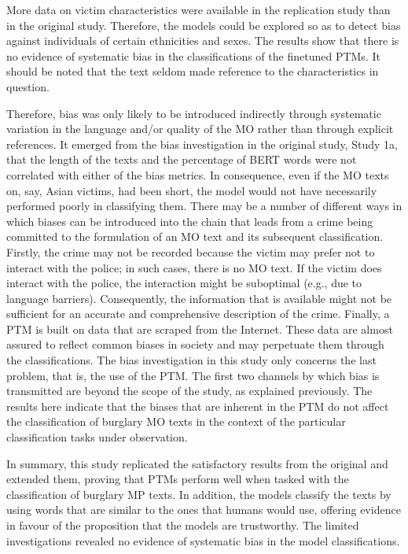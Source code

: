 More data on victim characteristics were available in the replication study than in the original study. Therefore, the models could be explored so as to detect bias against individuals of certain ethnicities and sexes. The results show that there is no evidence of systematic bias in the classifications of the finetuned PTMs. It should be noted that the text seldom made reference to the characteristics in question.

Therefore, bias was only likely to be introduced indirectly through systematic variation in the language and/or quality of the MO rather than through explicit references. It emerged from the bias investigation in the original study, Study 1a, that the length of the texts and the percentage of BERT words were not correlated with either of the bias metrics. In consequence, even if the MO texts on, say, Asian victims, had been short, the model would not have necessarily performed poorly in classifying them.
There may be a number of different ways in which biases can be introduced into the chain that leads from a crime being committed to the formulation of an MO text and its subsequent classification. Firstly, the crime may not be recorded because the victim may prefer not to interact with the police; in such cases, there is no MO text. If the victim does interact with the police, the interaction might be suboptimal (e.g., due to language barriers). Consequently, the information that is available might not be sufficient for an accurate and comprehensive description of the crime. Finally, a PTM is built on data that are scraped from the Internet. These data are almost assured to reflect common biases in society and may perpetuate them through the classifications. The bias investigation in this study only concerns the last problem, that is, the use of the PTM. The first two channels by which bias is transmitted are beyond the scope of the study, as explained previously. The results here indicate that the biases that are inherent in the PTM do not affect the classification of burglary MO texts in the context of the particular classification tasks under observation.

In summary, this study replicated the satisfactory results from the original and extended them, proving that PTMs perform well when tasked with the classification of burglary MP texts. In addition, the models classify the texts by using words that are similar to the ones that humans would use, offering evidence in favour of the proposition that the models are trustworthy. The limited investigations revealed no evidence of systematic bias in the model classifications.


